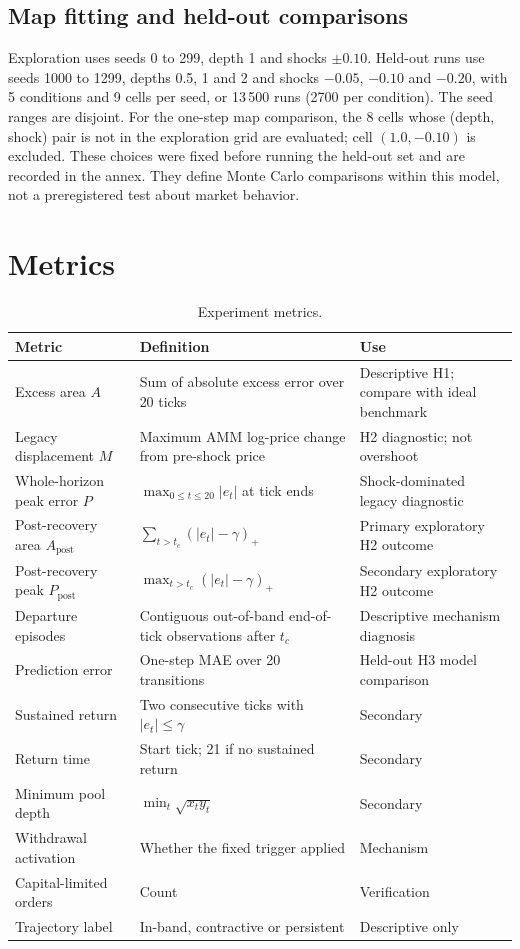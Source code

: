 \subsection{Map fitting and held-out comparisons}

Exploration uses seeds 0 to 299, depth 1 and shocks $\pm0.10$. Held-out runs use seeds 1000 to 1299, depths 0.5, 1 and 2 and shocks $-0.05$, $-0.10$ and $-0.20$, with 5 conditions and 9 cells per seed, or 13\,500 runs (2700 per condition). The seed ranges are disjoint. For the one-step map comparison, the 8 cells whose (depth, shock) pair is not in the exploration grid are evaluated; cell $(1.0,-0.10)$ is excluded. These choices were fixed before running the held-out set and are recorded in the annex. They define Monte Carlo comparisons within this model, not a preregistered test about market behavior.

\section{Metrics}

\begin{table}[htbp]
\centering
\caption{Experiment metrics.}
\label{tab:metricas}
\small
\begin{tabularx}{\textwidth}{@{}l >{\raggedright\arraybackslash}X l@{}}
\toprule
Metric & Definition & Use \\
\midrule
Excess area $A$ & Sum of absolute excess error over 20 ticks & Descriptive H1; compare with ideal benchmark \\
Legacy displacement $M$ & Maximum AMM log-price change from pre-shock price & H2 diagnostic; not overshoot \\
Whole-horizon peak error $P$ & $\max_{0\le t\le20}|e_t|$ at tick ends & Shock-dominated legacy diagnostic \\
Post-recovery area $A_{\mathrm{post}}$ & $\sum_{t>t_c}(|e_t|-\gamma)_+$ & Primary exploratory H2 outcome \\
Post-recovery peak $P_{\mathrm{post}}$ & $\max_{t>t_c}(|e_t|-\gamma)_+$ & Secondary exploratory H2 outcome \\
Departure episodes & Contiguous out-of-band end-of-tick observations after $t_c$ & Descriptive mechanism diagnosis \\
Prediction error & One-step MAE over 20 transitions & Held-out H3 model comparison \\
Sustained return & Two consecutive ticks with $|e_t|\le\gamma$ & Secondary \\
Return time & Start tick; 21 if no sustained return & Secondary \\
Minimum pool depth & $\min_t\sqrt{x_ty_t}$ & Secondary \\
Withdrawal activation & Whether the fixed trigger applied & Mechanism \\
Capital-limited orders & Count & Verification \\
Trajectory label & In-band, contractive or persistent & Descriptive only \\
\bottomrule
\end{tabularx}
\end{table}

